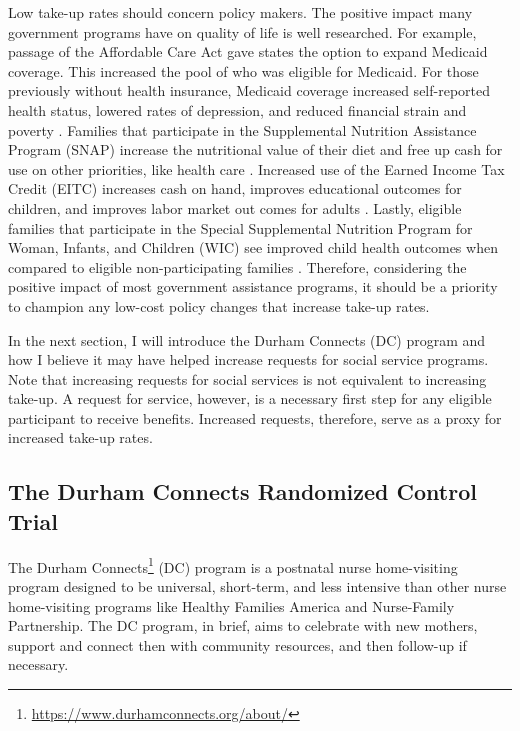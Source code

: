 \documentclass[12pt,letterpaperpaper,]{book}
\renewcommand{\href}[2]{#2\footnote{\url{#1}}}
\begin{document}
Low take-up rates should concern policy makers. The positive impact many
government programs have on quality of life is well researched. For
example, passage of the Affordable Care Act gave states the option to
expand Medicaid coverage. This increased the pool of who was eligible
for Medicaid. For those previously without health insurance, Medicaid
coverage increased self-reported health status, lowered rates of
depression, and reduced financial strain and poverty
\citep{baicker_oregon_2013, sommers_mortality_2012, sommers_poverty-reducing_2013}.
Families that participate in the Supplemental Nutrition Assistance
Program (SNAP) increase the nutritional value of their diet and free up
cash for use on other priorities, like health care
\citep{bartfeld_snap_2015, sonik_massachusetts_2016, miller_using_2017}.
Increased use of the Earned Income Tax Credit (EITC) increases cash on
hand, improves educational outcomes for children, and improves labor
market out comes for adults
\citep{grogger_effects_2003, bhargava_why_2012, dahl_impact_2012}.
Lastly, eligible families that participate in the Special Supplemental
Nutrition Program for Woman, Infants, and Children (WIC) see improved
child health outcomes when compared to eligible non-participating
families \citep{bitler_does_2005}. Therefore, considering the positive
impact of most government assistance programs, it should be a priority
to champion any low-cost policy changes that increase take-up rates.

In the next section, I will introduce the Durham Connects (DC) program
and how I believe it may have helped increase requests for social
service programs. Note that increasing requests for social services is
not equivalent to increasing take-up. A request for service, however, is
a necessary first step for any eligible participant to receive benefits.
Increased requests, therefore, serve as a proxy for increased take-up
rates.

\subsection*{The Durham Connects Randomized Control
Trial}\label{the-durham-connects-randomized-control-trial}

The \href{https://www.durhamconnects.org/about/}{Durham Connects} (DC)
program is a postnatal nurse home-visiting program designed to be
universal, short-term, and less intensive than other nurse home-visiting
programs like Healthy Families America and Nurse-Family Partnership. The
DC program, in brief, aims to celebrate with new mothers, support and
connect then with community resources, and then follow-up if necessary.
\end{document}
